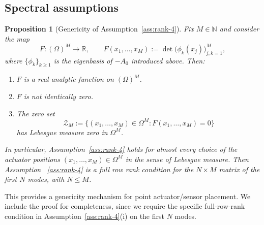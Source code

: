\documentclass[11pt,a4paper]{article}
\numberwithin{equation}{section}
\newtheorem{proposition}[theorem]{Proposition}
\theoremstyle{definition}
\newcommand{\1}{\mathbbm{1}}
\begin{document}
\subsection{Spectral assumptions}
\begin{proposition}[Genericity of Assumption~\ref{ass:rank-4}]
\label{prop:generic-rank}
Fix $M\in\mathbb{N}$ and consider the map
\[
F:(\Omega)^M \to \mathbb{R},\qquad
F(x_1,\dots,x_M) := \det\big(\phi_k(x_j)\big)_{j,k=1}^M,
\]
where $\{\phi_k\}_{k\ge1}$ is the eigenbasis of $-A_0$ introduced above.
Then:
\begin{enumerate}
\item[(a)] $F$ is a real-analytic function on $(\Omega)^M$.
\item[(b)] $F$ is not identically zero.
\item[(c)] The zero set 
\[
\mathcal{Z}_M := \{(x_1,\dots,x_M)\in\Omega^M : F(x_1,\dots,x_M)=0\}
\]
has Lebesgue measure zero in $\Omega^M$.
\end{enumerate}
In particular, Assumption~\ref{ass:rank-4} holds for almost every choice of
the actuator positions $(x_1,\dots,x_M)\in\Omega^M$ in the sense of
Lebesgue measure. Then Assumption ~\ref{ass:rank-4} is a full row rank condition for the 
$N\times M$ matrix of the first $
N$ modes, with $N \leq M$.
\end{proposition}
\noindent This provides a genericity mechanism for point actuator/sensor placement. We include the proof for completeness, since we require the specific full-row-rank condition in Assumption~\ref{ass:rank-4}(i) on the first $N$ modes.
 
\end{document}
